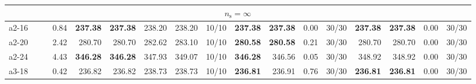\documentclass[aspectratio=1610]{beamer}
\begin{document}
\begin{frame}[noframenumbering]
\begin{table}[]
{\begin{tabular}{lrrrrrrrrrrrrrrrr}
\multicolumn{17}{c}{$n_\mathrm{s} = \infty$}                                                                                                                                                                                                                                                                                                                                                                                                                                                                                                                                   \\ \hline
a2-16                                          &                                                         & \multicolumn{1}{r|}{}                & 0.84                                                         & \textbf{237.38} & \multicolumn{1}{r|}{{\color[HTML]{FE0000} \textbf{237.38}}} & 238.20          & 238.20                                 & \multicolumn{1}{r|}{10/10} & \textbf{237.38} & {\color[HTML]{FE0000} \textbf{237.38}} & 0.00   & \multicolumn{1}{r|}{30/30} & \textbf{237.38}    & {\color[HTML]{FE0000} \textbf{237.38}}    & 0.00      & 30/30   \\
a2-20                                          &                                                         & \multicolumn{1}{r|}{}                & 2.42                                                         & 280.70          & \multicolumn{1}{r|}{280.70}                                 & 282.62          & 283.10                                 & \multicolumn{1}{r|}{10/10} & \textbf{280.58} & {\color[HTML]{FE0000} \textbf{280.58}} & 0.21   & \multicolumn{1}{r|}{30/30} & 280.70             & 280.70                                    & 0.00      & 30/30   \\
a2-24                                          &                                                         & \multicolumn{1}{r|}{}                & 4.43                                                         & \textbf{346.28} & \multicolumn{1}{r|}{{\color[HTML]{FE0000} \textbf{346.28}}} & 347.93          & 349.07                                 & \multicolumn{1}{r|}{10/10} & \textbf{346.28} & 346.56                                 & 0.05   & \multicolumn{1}{r|}{30/30} & 348.92             & 348.92                                    & 0.00      & 30/30   \\
a3-18                                          &                                                         & \multicolumn{1}{r|}{}                & 0.42                                                         & 236.82          & \multicolumn{1}{r|}{236.82}                                 & 238.73          & 238.73                                 & \multicolumn{1}{r|}{10/10} & \textbf{236.81} & 236.91                                 & 0.76   & \multicolumn{1}{r|}{30/30} & \textbf{236.81}    & {\color[HTML]{FE0000} \textbf{236.81}}    & 0.00      & 30/30   \\

\end{tabular}}
\end{table}
\end{frame}
\end{document}

